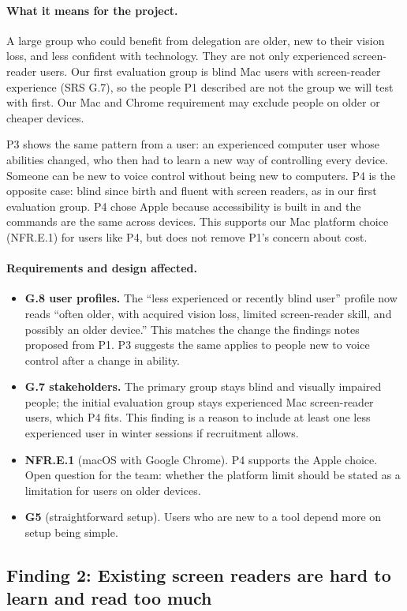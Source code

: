\documentclass[12pt, titlepage]{article}
\newcommand{\means}{\paragraph{What it means for the project.}}
\newcommand{\affects}{\paragraph{Requirements and design affected.}}
\begin{document}
\means
A large group who could benefit from delegation are older, new to their vision loss, and less confident with technology. They are not only experienced screen-reader users. Our first evaluation group is blind Mac users with screen-reader experience (SRS G.7), so the people P1 described are not the group we will test with first. Our Mac and Chrome requirement may exclude people on older or cheaper devices.

P3 shows the same pattern from a user: an experienced computer user whose abilities changed, who then had to learn a new way of controlling every device. Someone can be new to voice control without being new to computers. P4 is the opposite case: blind since birth and fluent with screen readers, as in our first evaluation group. P4 chose Apple because accessibility is built in and the commands are the same across devices. This supports our Mac platform choice (NFR.E.1) for users like P4, but does not remove P1's concern about cost.

\affects
\begin{itemize}
    \item \textbf{G.8 user profiles.} The ``less experienced or recently blind user'' profile now reads ``often older, with acquired vision loss, limited screen-reader skill, and possibly an older device.'' This matches the change the findings notes proposed from P1. P3 suggests the same applies to people new to voice control after a change in ability.
    \item \textbf{G.7 stakeholders.} The primary group stays blind and visually impaired people; the initial evaluation group stays experienced Mac screen-reader users, which P4 fits. This finding is a reason to include at least one less experienced user in winter sessions if recruitment allows.
    \item \textbf{NFR.E.1} (macOS with Google Chrome). P4 supports the Apple choice. Open question for the team: whether the platform limit should be stated as a limitation for users on older devices.
    \item \textbf{G5} (straightforward setup). Users who are new to a tool depend more on setup being simple.
\end{itemize}

\subsection{Finding 2: Existing screen readers are hard to learn and read too much}
\end{document}
